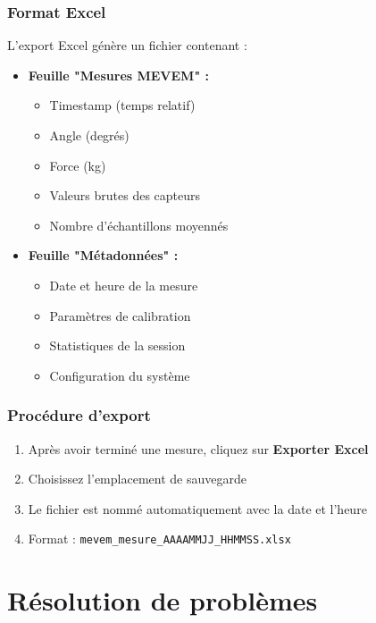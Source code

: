 \documentclass[12pt,a4paper]{article}
\begin{document}
\subsubsection{Format Excel}

L'export Excel génère un fichier contenant :

\begin{itemize}
    \item \textbf{Feuille "Mesures MEVEM" :}
    \begin{itemize}
        \item Timestamp (temps relatif)
        \item Angle (degrés)
        \item Force (kg)
        \item Valeurs brutes des capteurs
        \item Nombre d'échantillons moyennés
    \end{itemize}
    
    \item \textbf{Feuille "Métadonnées" :}
    \begin{itemize}
        \item Date et heure de la mesure
        \item Paramètres de calibration
        \item Statistiques de la session
        \item Configuration du système
    \end{itemize}
\end{itemize}

\subsubsection{Procédure d'export}

\begin{enumerate}
    \item Après avoir terminé une mesure, cliquez sur \textbf{Exporter Excel}
    \item Choisissez l'emplacement de sauvegarde
    \item Le fichier est nommé automatiquement avec la date et l'heure
    \item Format : \texttt{mevem\_mesure\_AAAAMMJJ\_HHMMSS.xlsx}
\end{enumerate}

\section{Résolution de problèmes}
\end{document}
